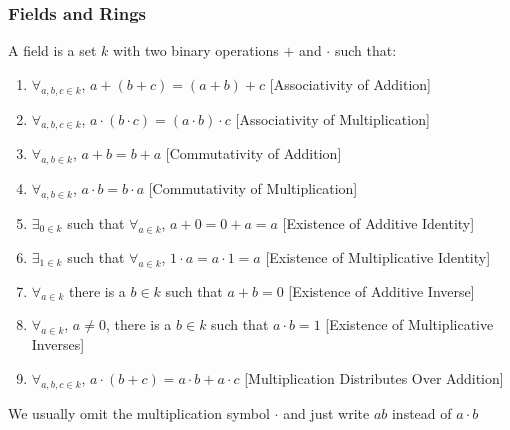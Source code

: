 \documentclass[crop=false,class=article,oneside]{standalone}
\begin{document}
        \subsubsection{Fields and Rings}
            \begin{definition}
                A field is a set $k$ with two binary
                operations $+$ and $\cdot$ such that:
                \begin{enumerate}
                    \item $\forall_{a,b,c\in k}$,
                          $a+(b+c)=(a+b)+c$
                          \hfill[Associativity of Addition]
                    \item $\forall_{a,b,c\in k}$,
                          $a\cdot(b\cdot c)=(a\cdot b)\cdot c$
                          \hfill[Associativity of Multiplication]
                    \item $\forall_{a,b\in k}$,
                          $a+b=b+a$
                          \hfill[Commutativity of Addition]
                    \item $\forall_{a,b\in k}$,
                          $a\cdot b=b\cdot a$
                          \hfill[Commutativity of Multiplication]
                    \item $\exists_{0 \in k}$ such that
                          $\forall_{a\in k}$,
                          $a+0=0+a=a$
                          \hfill[Existence of Additive Identity]
                    \item $\exists_{1\in k}$ such that
                          $\forall_{a\in k}$,
                          $1\cdot a=a\cdot 1=a$
                          \hfill[Existence of Multiplicative Identity]
                    \item $\forall_{a\in k}$ there is a
                          $b\in k$ such that $a+b=0$
                          \hfill[Existence of Additive Inverse]
                    \item $\forall_{a\in k}$, $a\ne 0$,
                          there is a $b\in k$ such that
                          $a\cdot b=1$
                          \hfill [Existence of Multiplicative Inverses]
                    \item $\forall_{a,b,c\in k}$,
                          $a\cdot(b+c)=a\cdot b+a\cdot c$
                          \hfill[Multiplication Distributes Over Addition]
                \end{enumerate}
            \end{definition}
            \begin{remark}
                We usually omit the multiplication
                symbol $\cdot$ and just write $ab$ instead
                of $a\cdot b$
            \end{remark}
\end{document}
